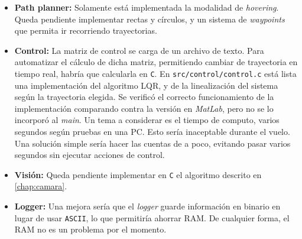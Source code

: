 \documentclass[main]{subfiles}
\begin{document}
\begin{itemize}
\item \textbf{Path planner:} Solamente está implementada la modalidad de \textit{hovering}. Queda pendiente implementar rectas y círculos, y un sistema de \textit{waypoints} que permita ir recorriendo trayectorias.
\item \textbf{Control:} La matriz de control se carga de un archivo de texto. Para automatizar el cálculo de dicha matriz, permitiendo cambiar de trayectoria en tiempo real, habría que calcularla en \verb+C+.\newline
En \verb+src/control/control.c+ está lista una implementación del algoritmo LQR, y de la linealización del sistema según la trayectoria elegida. Se verific\'o el correcto funcionamiento de la implementaci\'on comparando contra la versi\'on en \textit{MatLab}, pero no se lo incorpor\'o al \textit{main}.\newline
Un tema a considerar es el tiempo de computo, varios segundos seg\'un pruebas en una PC. Esto ser\'ia inaceptable durante el vuelo. Una soluci\'on simple ser\'ia hacer las cuentas de a poco, evitando pasar varios segundos sin ejecutar acciones de control.
\item \textbf{Visión:} Queda pendiente implementar en \verb+C+ el algoritmo descrito en \ref{chap:camara}.
\item \textbf{Logger:} Una mejora sería que el \textit{logger} guarde información en binario en lugar de usar \verb+ASCII+, lo que permitiría ahorrar RAM. De cualquier forma, el RAM no es un problema por el momento.
\end{itemize}
\end{document}
